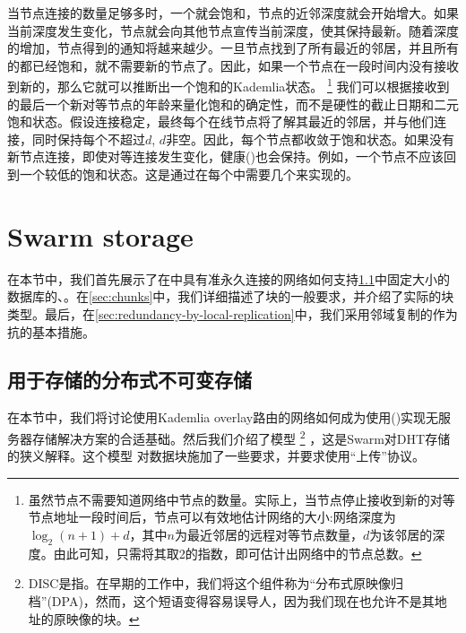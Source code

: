 当节点连接的数量足够多时，一个就会饱和，节点的近邻深度就会开始增大。如果当前深度发生变化，节点就会向其他节点宣传当前深度，使其保持最新。随着深度的增加，节点得到的通知将越来越少。一旦节点找到了所有最近的邻居，并且所有的都已经饱和，就不需要新的节点了。因此，如果一个节点在一段时间内没有接收到新的，那么它就可以推断出一个饱和的Kademlia状态。%
%
\footnote{虽然节点不需要知道网络中节点的数量。实际上，当节点停止接收到新的对等节点地址一段时间后，节点可以有效地估计网络的大小:网络深度为$\log_2(n+1)+ d$，其中$n$为最近邻居的远程对等节点数量，$d$为该邻居的深度。由此可知，只需将其取2的指数，即可估计出网络中的节点总数。}
%
我们可以根据接收到的最后一个新对等节点的年龄来量化饱和的确定性，而不是硬性的截止日期和二元饱和状态。假设连接稳定，最终每个在线节点将了解其最近的邻居，并与他们连接，同时保持每个不超过$d$, $d$非空。因此，每个节点都收敛于饱和状态。如果没有新节点连接，即使对等连接发生变化，健康()也会保持。例如，一个节点不应该回到一个较低的饱和状态。这是通过在每个中需要几个来实现的。 

\section{Swarm storage\statusgreen}\label{sec:kademlia-storage}

在本节中，我们首先展示了在中具有准永久连接的网络如何支持\ref{sec:disc}中固定大小的数据库的、。在\ref{sec:chunks}中，我们详细描述了块的一般要求，并介绍了实际的块类型。最后，在\ref{sec:redundancy-by-local-replication}中，我们采用邻域复制的作为抗的基本措施。

\subsection{用于存储的分布式不可变存储\statusgreen}\label{sec:disc}
 
在本节中，我们将讨论使用Kademlia overlay路由的网络如何成为使用()实现无服务器存储解决方案的合适基础。然后我们介绍了模型%
%
\footnote{DISC是指。在早期的工作中，我们将这个组件称为“分布式原映像归档”(DPA)，然而，这个短语变得容易误导人，因为我们现在也允许不是其地址的原映像的块。}
% 
，这是Swarm对DHT存储的狭义解释。这个模型 
对数据块施加了一些要求，并要求使用“上传”协议。 

